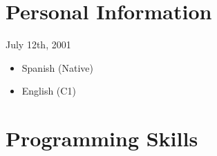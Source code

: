 \documentclass[]{single-page-resume}
\begin{document}
\begin{minipage}[t]{0.3\textwidth} 

\begin{comment}
    

\section{Links} 
Bio: \href{http://stephlocke.info}{\custombold{stephlocke.info}} \\
Company: \href{https://itsalocke.com}{\custombold{itsalocke.com}} \\
Github: \href{https://github.com/stephlocke}{\custombold{stephlocke}} \\
Twitter: \href{https://twitter.com/stefflocke}{\custombold{@stefflocke}} \\
LinkedIn: \href{http://uk.linkedin.com/in/stephanielocke/}{\custombold{stephanielocke}} \\
Stack Exchange: \href{http://stackexchange.com/users/968082/steph-locke}{\custombold{steph locke}} 
\end{comment}

\section{Personal Information} 


July 12th, 2001

\sectionsep
{}
\begin{itemize}
    \item {Spanish (Native)}
    \item English (C1)
\end{itemize}



\section{Programming Skills}
\begin{comment}
    


\end{comment}
\end{minipage}
\end{document}
